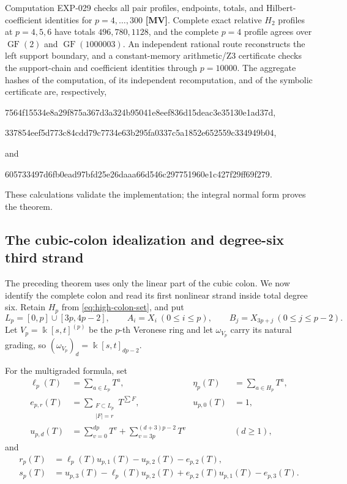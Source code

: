\documentclass[11pt]{article}
\theoremstyle{definition}
\theoremstyle{remark}
\newcommand{\kfield}{\Bbbk}
\begin{document}
Computation EXP-029 checks all pair profiles, endpoints, totals, and Hilbert-coefficient
identities for \(p=4,\ldots,300\) \textbf{[MV]}. Complete exact relative \(H_2\) profiles at \(p=4,5,6\) have
totals \(496,780,1128\), and the complete \(p=4\) profile agrees over
\(\operatorname{GF}(2)\) and \(\operatorname{GF}(1000003)\). An independent rational route
reconstructs the left support boundary, and a constant-memory arithmetic/Z3 certificate checks the
support-chain and coefficient identities through \(p=10000\). The aggregate hashes of the
computation, of its independent recomputation, and of the symbolic certificate are, respectively,
\begin{center}
{\fontsize{7}{8}\selectfont\ttfamily 7564f15534e8a29f875a367d3a324b95041e8eef836d15deac3e35130e1ad37d},
\end{center}
\begin{center}
{\fontsize{7}{8}\selectfont\ttfamily 337854eef5d773c84cdd79c7734e63b295fa0337c5a1852e652559c334949b04},
\end{center}
and
\begin{center}
{\fontsize{7}{8}\selectfont\ttfamily 605733497d6fb0ead97bfd25e26daaa66d546c297751960e1c427f29ff69f279}.
\end{center}
These calculations validate the implementation; the integral normal form proves the theorem.

\subsection{The cubic-colon idealization and degree-six third strand}

The preceding theorem uses only the linear part of the cubic colon. We now identify the complete
colon and read its first nonlinear strand inside total degree six. Retain $H_p$ from
\eqref{eq:high-colon-set}, and put
\[
L_p=[0,p]\cup[3p,4p-2],\qquad
A_i=X_i\ (0\le i\le p),\qquad B_j=X_{3p+j}\ (0\le j\le p-2).
\]
Let $V_p=\kfield[s,t]^{(p)}$ be the $p$-th Veronese ring and let
$\omega_{V_p}$ carry its natural grading, so
$(\omega_{V_p})_d=\kfield[s,t]_{dp-2}$.

For the multigraded formula, set
\begin{align*}
\ell_p(T)&=\sum_{a\in L_p}T^a,
&\eta_p(T)&=\sum_{a\in H_p}T^a,\\
e_{p,r}(T)&=\sum_{\substack{F\subset L_p\\|F|=r}}T^{\sum F},
&u_{p,0}(T)&=1,\\
u_{p,d}(T)&=\sum_{v=0}^{dp}T^v+\sum_{v=3p}^{(d+3)p-2}T^v &&(d\ge1),
\end{align*}
and
\begin{align}
r_p(T)&=\ell_p(T)u_{p,1}(T)-u_{p,2}(T)-e_{p,2}(T),\label{eq:colon-quadratic-profile}\\
s_p(T)&=u_{p,3}(T)-\ell_p(T)u_{p,2}(T)
 +e_{p,2}(T)u_{p,1}(T)-e_{p,3}(T).\label{eq:colon-linear-syzygy-profile}
\end{align}
\end{document}
